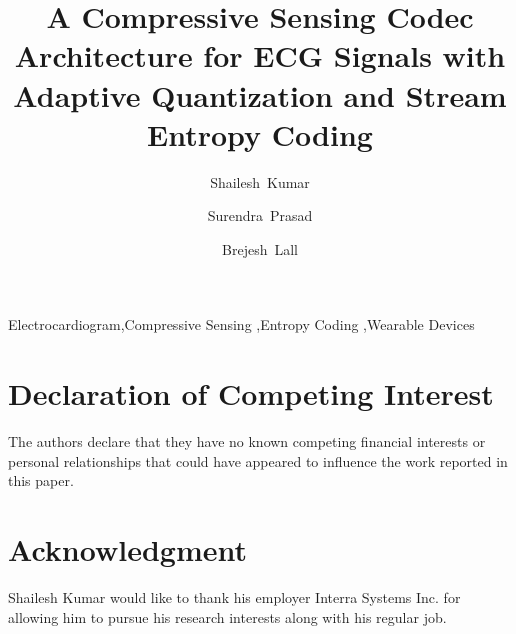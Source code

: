 \documentclass[preprint]{elsarticle} %
\begin{document}
\begin{frontmatter}
\title{A Compressive Sensing Codec Architecture for ECG Signals
with Adaptive Quantization and Stream Entropy Coding}

\author[inst1]{Shailesh~Kumar}

\author[inst1]{Surendra~Prasad}

\author[inst1]{Brejesh~Lall}



\begin{keyword}
Electrocardiogram\sep Compressive Sensing \sep Entropy Coding
\sep Wearable Devices
\end{keyword}
\end{frontmatter}







% 


\section*{Declaration of Competing Interest}
The authors declare that they have no known competing financial interests or personal relationships that could have appeared to influence the work reported in this paper.

\section*{Acknowledgment}
Shailesh Kumar would like to thank his employer Interra Systems Inc.
for allowing him to pursue his research interests along with his regular job.

 


\end{document}
